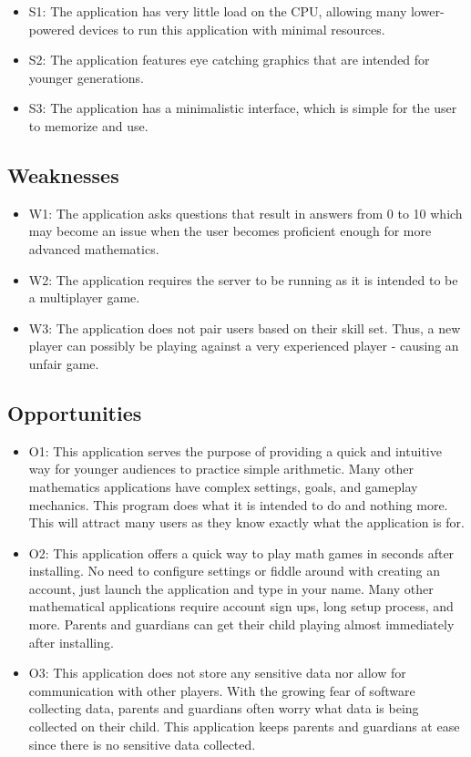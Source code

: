 \documentclass[12pt]{article}
\begin{document}
\begin{itemize}
\item S1: The application has very little load on the CPU, allowing many lower-powered devices to run this application with minimal resources.
\item S2: The application features eye catching graphics that are intended for younger generations.
\item S3: The application has a minimalistic interface, which is simple for the user to memorize and use.
\end{itemize}

\subsection{Weaknesses}

\begin{itemize}
\item W1: The application asks questions that result in answers from 0 to 10 which may become an issue when the user becomes proficient enough for more advanced mathematics.
\item W2: The application requires the server to be running as it is intended to be a multiplayer game.
\item W3: The application does not pair users based on their skill set. Thus, a new player can possibly be playing against a very experienced player - causing an unfair game.
\end{itemize}

\subsection{Opportunities}

\begin{itemize}
\item O1: This application serves the purpose of providing a quick and intuitive way for younger audiences to practice simple arithmetic. Many other mathematics applications have complex settings, goals, and gameplay mechanics. This program does what it is intended to do and nothing more. This will attract many users as they know exactly what the application is for.
\item O2: This application offers a quick way to play math games in seconds after installing. No need to configure settings or fiddle around with creating an account, just launch the application and type in your name. Many other mathematical applications require account sign ups, long setup process, and more. Parents and guardians can get their child playing almost immediately after installing. 
\item O3: This application does not store any sensitive data nor allow for communication with other players. With the growing fear of software collecting data, parents and guardians often worry what data is being collected on their child. This application keeps parents and guardians at ease since there is no sensitive data collected. 
\end{itemize}
\end{document}
